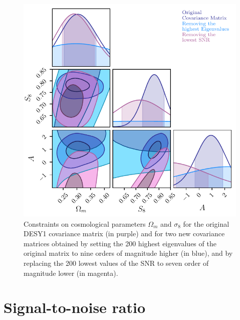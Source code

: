 \documentclass[twocolumn]{\docclass}
\begin{document}
	\begin{figure}
		\includegraphics[width=0.9\columnwidth]{Parameters-200.pdf}
		\caption{Constraints on cosmological parameters $\Omega_m$ and $\sigma_8$ for the original DESY1 covariance matrix (in purple) and for two new covariance matrices obtained by setting the 200 highest eigenvalues of the original matrix to nine orders of magnitude higher (in blue), and by replacing the 200 lowest values of the SNR to seven order of magnitude lower (in magenta). \label{fig:eig_snr}}
	\end{figure}
	
	
	\section{Signal-to-noise ratio}
	
\end{document}
